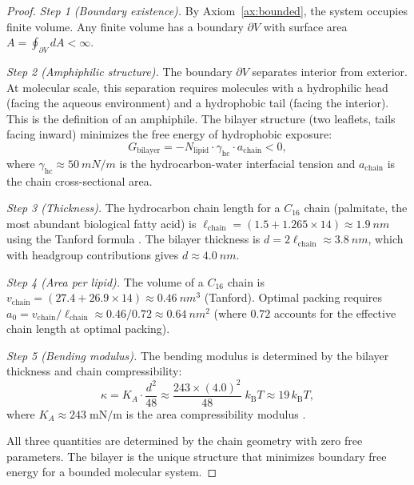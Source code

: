 \documentclass[twocolumn,10pt]{article}
\theoremstyle{definition}
\theoremstyle{remark}
\newcommand{\kB}{k_{\mathrm{B}}}
\begin{document}
\begin{proof}
\emph{Step 1 (Boundary existence).} By Axiom~\ref{ax:bounded}, the system occupies finite volume. Any finite volume has a boundary $\partial V$ with surface area $A = \oint_{\partial V} dA < \infty$.

\emph{Step 2 (Amphiphilic structure).} The boundary $\partial V$ separates interior from exterior. At molecular scale, this separation requires molecules with a hydrophilic head (facing the aqueous environment) and a hydrophobic tail (facing the interior). This is the definition of an amphiphile. The bilayer structure (two leaflets, tails facing inward) minimizes the free energy of hydrophobic exposure:
\begin{equation}
  G_{\mathrm{bilayer}} = -N_{\mathrm{lipid}} \cdot \gamma_{\mathrm{hc}} \cdot a_{\mathrm{chain}} < 0,
  \label{eq:bilayer_energy}
\end{equation}
where $\gamma_{\mathrm{hc}} \approx \SI{50}{mN/m}$ is the hydrocarbon-water interfacial tension and $a_{\mathrm{chain}}$ is the chain cross-sectional area.

\emph{Step 3 (Thickness).} The hydrocarbon chain length for a $C_{16}$ chain (palmitate, the most abundant biological fatty acid) is $\ell_{\mathrm{chain}} = (1.5 + 1.265 \times 14) \approx \SI{1.9}{nm}$ using the Tanford formula \cite{lipowsky1995structure}. The bilayer thickness is $d = 2\ell_{\mathrm{chain}} \approx \SI{3.8}{nm}$, which with headgroup contributions gives $d \approx \SI{4.0}{nm}$.

\emph{Step 4 (Area per lipid).} The volume of a $C_{16}$ chain is $v_{\mathrm{chain}} = (27.4 + 26.9 \times 14) \approx \SI{0.46}{nm^3}$ (Tanford). Optimal packing requires $a_0 = v_{\mathrm{chain}}/\ell_{\mathrm{chain}} \approx 0.46/0.72 \approx \SI{0.64}{nm^2}$ (where $0.72$ accounts for the effective chain length at optimal packing).

\emph{Step 5 (Bending modulus).} The bending modulus is determined by the bilayer thickness and chain compressibility:
\begin{equation}
  \kappa = K_A \cdot \frac{d^2}{48} \approx \frac{243 \times (4.0)^2}{48}\; \kB T \approx 19\,\kB T,
  \label{eq:bending}
\end{equation}
where $K_A \approx 243\;\mathrm{mN/m}$ is the area compressibility modulus \cite{helfrich1973elastic}.

All three quantities are determined by the chain geometry with zero free parameters. The bilayer is the unique structure that minimizes boundary free energy for a bounded molecular system.
\end{proof}
\end{document}
